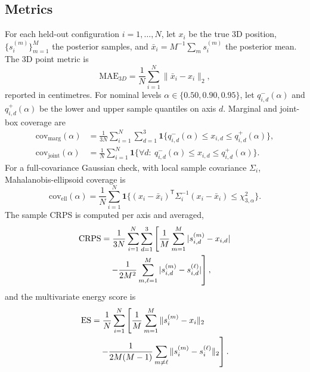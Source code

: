\subsection{Metrics}
For each held-out configuration $i=1,\ldots,N$, let $x_i$ be the true 3D
position, $\{s_i^{(m)}\}_{m=1}^{M}$ the posterior samples, and
$\bar{x}_i=M^{-1}\sum_m s_i^{(m)}$ the posterior mean. The 3D point metric is
\begin{equation}
\mathrm{MAE}_{3D}=\frac{1}{N}\sum_{i=1}^{N}\|\bar{x}_i-x_i\|_2 ,
\label{eq:mae3d}
\end{equation}
reported in centimetres. For nominal levels
$\alpha\in\{0.50,0.90,0.95\}$, let $q^{-}_{i,d}(\alpha)$ and
$q^{+}_{i,d}(\alpha)$ be the lower and upper sample quantiles on axis $d$.
Marginal and joint-box coverage are
\begin{align}
\mathrm{cov}_{\mathrm{marg}}(\alpha)
&=\frac{1}{3N}\sum_{i=1}^{N}\sum_{d=1}^{3}
\mathbf{1}\{q^{-}_{i,d}(\alpha)\le x_{i,d}\le q^{+}_{i,d}(\alpha)\},\\
\mathrm{cov}_{\mathrm{joint}}(\alpha)
&=\frac{1}{N}\sum_{i=1}^{N}
\mathbf{1}\{\forall d:\ q^{-}_{i,d}(\alpha)\le x_{i,d}\le q^{+}_{i,d}(\alpha)\}.
\label{eq:coverage}
\end{align}
For a full-covariance Gaussian check, with local sample covariance $\Sigma_i$,
Mahalanobis-ellipsoid coverage is
\begin{equation}
\mathrm{cov}_{\mathrm{ell}}(\alpha)=\frac{1}{N}\sum_{i=1}^{N}
\mathbf{1}\{(x_i-\bar{x}_i)^\mathsf{T}\Sigma_i^{-1}(x_i-\bar{x}_i)
\le \chi^2_{3,\alpha}\}.
\label{eq:ellipsoid}
\end{equation}
The sample CRPS is computed per axis and averaged,
\begin{align}
\mathrm{CRPS}
&=\frac{1}{3N}\sum_{i=1}^{N}\sum_{d=1}^{3}
\left[
\frac{1}{M}\sum_{m=1}^{M}|s_{i,d}^{(m)}-x_{i,d}|
\right. \notag\\
&\quad\left.
-\frac{1}{2M^2}\sum_{m,\ell=1}^{M}
|s_{i,d}^{(m)}-s_{i,d}^{(\ell)}|
\right],
\label{eq:crps}
\end{align}
and the multivariate energy score is
\begin{align}
\mathrm{ES}
&=\frac{1}{N}\sum_{i=1}^{N}
\left[
\frac{1}{M}\sum_{m=1}^{M}\|s_i^{(m)}-x_i\|_2
\right. \notag\\
&\quad\left.
-\frac{1}{2M(M-1)}\sum_{m\ne \ell}\|s_i^{(m)}-s_i^{(\ell)}\|_2
\right].
\label{eq:energy}
\end{align}

